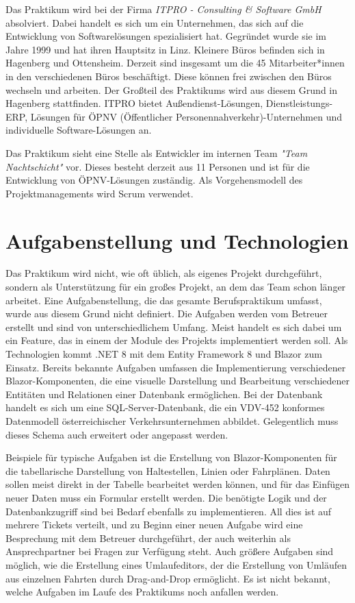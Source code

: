 Das Praktikum wird bei der Firma \emph{ITPRO - Consulting \& Software GmbH} absolviert. Dabei handelt es sich um ein Unternehmen, das sich auf die Entwicklung von Softwarelösungen 
spezialisiert hat. Gegründet wurde sie im Jahre 1999 und hat ihren Hauptsitz in Linz. Kleinere Büros befinden sich in Hagenberg und Ottensheim. Derzeit sind insgesamt um die 
45 Mitarbeiter*innen in den verschiedenen Büros beschäftigt. Diese können frei zwischen den Büros wechseln und arbeiten. Der Großteil des Praktikums wird aus diesem Grund 
in Hagenberg stattfinden.
ITPRO bietet Außendienst-Lösungen, Dienstleistungs-ERP, Lösungen für ÖPNV (Öffentlicher Personennahverkehr)-Unternehmen und individuelle Software-Lösungen an.

Das Praktikum sieht eine Stelle als Entwickler im internen Team \emph{"Team Nachtschicht"} vor. Dieses besteht derzeit aus 11 Personen und ist für die Entwicklung 
von ÖPNV-Lösungen zuständig. Als Vorgehensmodell des Projektmanagements wird Scrum verwendet.

\section{Aufgabenstellung und Technologien} \label{sec:aufgabenstellung}

Das Praktikum wird nicht, wie oft üblich, als eigenes Projekt durchgeführt, sondern als Unterstützung für ein großes Projekt, an dem das Team schon länger arbeitet.
Eine Aufgabenstellung, die das gesamte Berufspraktikum umfasst, wurde aus diesem Grund nicht definiert. Die Aufgaben werden vom Betreuer erstellt und sind von unterschiedlichem Umfang.
Meist handelt es sich dabei um ein Feature, das in einem der Module des Projekts implementiert werden soll.
Als Technologien kommt .NET 8 mit dem Entity Framework 8 und Blazor zum Einsatz. Bereits bekannte Aufgaben umfassen die Implementierung verschiedener Blazor-Komponenten,
die eine visuelle Darstellung und Bearbeitung verschiedener Entitäten und Relationen einer Datenbank ermöglichen. Bei der Datenbank handelt es sich um eine SQL-Server-Datenbank,
die ein VDV-452 konformes Datenmodell österreichischer Verkehrsunternehmen abbildet. 
Gelegentlich muss dieses Schema auch erweitert oder angepasst werden. 

Beispiele für typische Aufgaben ist die Erstellung von Blazor-Komponenten für die tabellarische Darstellung von Haltestellen, Linien oder Fahrplänen. Daten sollen 
meist direkt in der Tabelle bearbeitet werden können, und für das Einfügen neuer Daten muss ein Formular erstellt werden. Die benötigte Logik und der Datenbankzugriff
sind bei Bedarf ebenfalls zu implementieren. All dies ist auf mehrere Tickets verteilt, und zu Beginn einer neuen Aufgabe wird eine Besprechung mit dem Betreuer durchgeführt,
der auch weiterhin als Ansprechpartner bei Fragen zur Verfügung steht. 
Auch größere Aufgaben sind möglich, wie die Erstellung eines Umlaufeditors, der die Erstellung von Umläufen aus einzelnen Fahrten durch Drag-and-Drop ermöglicht.
Es ist nicht bekannt, welche Aufgaben im Laufe des Praktikums noch anfallen werden.

